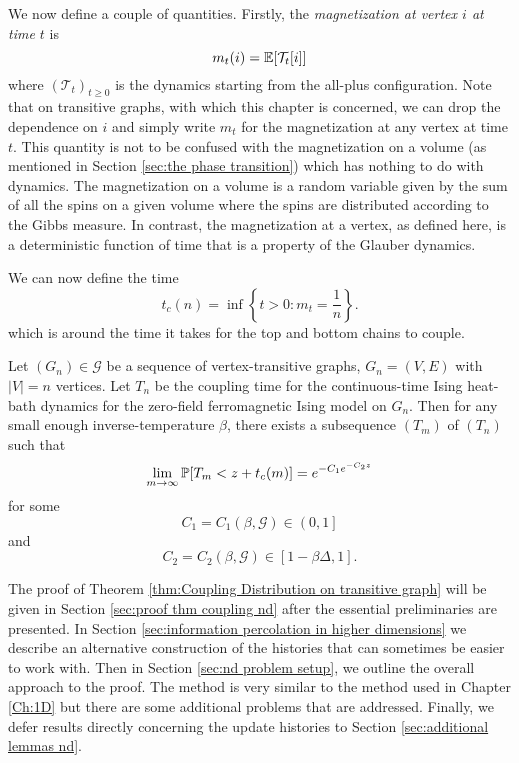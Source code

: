 We now define a couple of quantities. Firstly, the \emph{magnetization at vertex $i$ at time $t$} is
\begin{equation}
	 	m_t(i) = \mathbb{E}[\mathcal{T}_t[i]]
\end{equation} 
where $(\mathcal{T}_t)_{t \geq 0}$ is the dynamics starting from the all-plus configuration. Note that on transitive graphs, with which this chapter is concerned, we can drop the dependence on $i$ and simply write $m_t$ for the magnetization at any vertex at time $t$. This quantity is not to be confused with the magnetization on a volume (as mentioned in Section \ref{sec:the phase transition}) which has nothing to do with dynamics. The magnetization on a volume is a random variable given by the sum of all the spins on a given volume where the spins are distributed according to the Gibbs measure. In contrast, the magnetization at a vertex, as defined here, is a deterministic function of time that is a property of the Glauber dynamics.

We can now define the time
\begin{equation}
	\label{eq:definition t_c(n)}
	t_c(n) = \inf\left\{ t > 0 : m_t = \frac{1}{n}\right\}.
\end{equation}
which is around the time it takes for the top and bottom chains to couple.

\begin{theorem}
\label{thm:Coupling Distribution on transitive graph}
	Let $(G_n) \in \mathscr{G}$ be a sequence of vertex-transitive graphs, $G_n = (V, E)$ with $|V| = n$ vertices. Let $T_n$ be the coupling time for the continuous-time Ising heat-bath dynamics for the zero-field ferromagnetic Ising model on $G_n$. Then for any small enough inverse-temperature $\beta$, there exists a subsequence $(T_m)$ of $(T_n)$ such that
	\begin{equation}
		\lim_{m \rightarrow \infty} \mathbb{P}[T_m < z + t_c(m)] = e^{-C_1e^{-C_2 z}}
	\end{equation}
	for some
	\begin{equation}
		C_1 = C_1(\beta, \mathscr{G}) \in \left(0,1\right]
	\end{equation}
	and
	\begin{equation}
		C_2 = C_2(\beta, \mathscr{G}) \in \left[1 - \beta \Delta, 1\right].
	\end{equation}

\end{theorem}

The proof of Theorem \ref{thm:Coupling Distribution on transitive graph} will be given in Section \ref{sec:proof thm coupling nd} after the essential preliminaries are presented. In Section \ref{sec:information percolation in higher dimensions} we describe an alternative construction of the histories that can sometimes be easier to work with. Then in Section \ref{sec:nd problem setup}, we outline the overall approach to the proof. The method is very similar to the method used in Chapter \ref{Ch:1D} but there are some additional problems that are addressed. Finally, we defer results directly concerning the update histories to Section \ref{sec:additional lemmas nd}.


